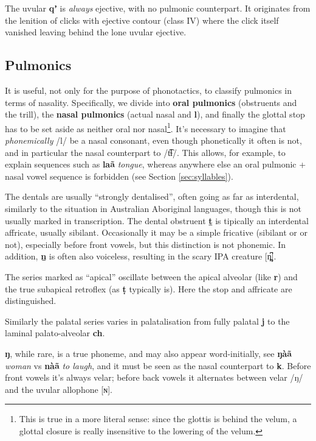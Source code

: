 \documentclass[11pt,a5paper]{book}
\newcommand{\qcn}[1]{\textcolor{AccentText}{\large\textbf{#1}}}
\newcommand{\transl}[2]{\qcn{#1} \emph{#2}}
\begin{document}
The uvular \qcn{qʼ} is \emph{always} ejective, with no pulmonic counterpart. It originates from the lenition of clicks with ejective contour (class IV) where the click itself vanished leaving behind the lone uvular ejective.

\subsection{Pulmonics}	

It is useful, not only for the purpose of phonotactics, to classify pulmonics in terms of nasality. Specifically, we divide into \textbf{oral pulmonics} (obstruents and the trill), the \textbf{nasal pulmonics} (actual nasal and \qcn{l}), and finally the glottal stop has to be set aside as neither oral nor nasal\footnote{This is true in a more literal sense: since the glottis is behind the velum, a glottal closure is really insensitive to the lowering of the velum.}. It's necessary to imagine that \emph{phonemically} /l/ be a nasal consonant, even though phonetically it often is not, and in particular the nasal counterpart to /t͡ɬ/. This allows, for example, to explain sequences such as \transl{laã}{tongue}, whereas anywhere else an oral pulmonic + nasal vowel sequence is forbidden (see Section \ref{sec:syllables}).

The dentals are usually ``strongly dentalised'', often going as far as interdental, similarly to the situation in Australian Aboriginal languages, though this is not usually marked in transcription. The dental obstruent \qcn{ṯ} is tipically an interdental affricate, usually sibilant. Occasionally it may be a simple fricative (sibilant or or not), especially before front vowels, but this distinction is not phonemic. In addition, \qcn{ṉ} is often also voiceless, resulting in the scary IPA creature [n̪̥͆].

The series marked as ``apical'' oscillate between the apical alveolar (like \qcn{r}) and the true subapical retroflex (as \qcn{ṭ} typically is). Here the stop and affricate are distinguished.

Similarly the palatal series varies in palatalisation from fully palatal \qcn{j} to the laminal palato-alveolar \qcn{ch}.

\qcn{ŋ}, while rare, is a true phoneme, and may also appear word-initially, see \transl{ŋàã}{woman} vs \transl{nàã}{to laugh}, and it must be seen as the nasal counterpart to \qcn{k}. Before front vowels it's always velar; before back vowels it alternates between velar /ŋ/ and the uvular allophone [ɴ].
\end{document}
